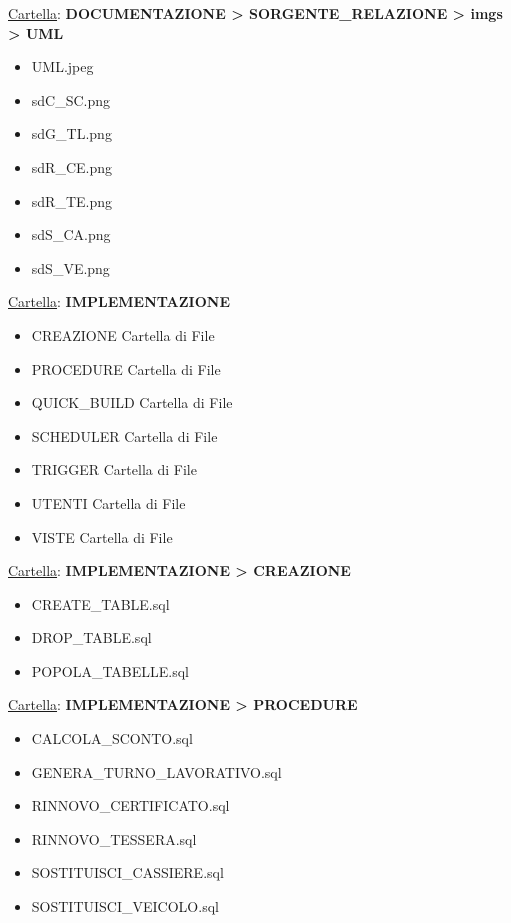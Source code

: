 \documentclass[12pt]{report}
\begin{document}
\underline{Cartella}: \textbf{DOCUMENTAZIONE > SORGENTE\_RELAZIONE > imgs > UML}
\begin{itemize}
\item UML.jpeg
\item sdC\_SC.png
\item sdG\_TL.png
\item sdR\_CE.png
\item sdR\_TE.png
\item sdS\_CA.png
\item sdS\_VE.png
\end{itemize}

\underline{Cartella}: \textbf{IMPLEMENTAZIONE}
\begin{itemize}
\item CREAZIONE				\hspace{38mm} Cartella di File
\item PROCEDURE				\hspace{36mm} Cartella di File
\item QUICK\_BUILD			\hspace{33mm} Cartella di File
\item SCHEDULER				\hspace{36mm} Cartella di File
\item TRIGGER				\hspace{43mm} Cartella di File
\item UTENTI				\hspace{45mm} Cartella di File
\item VISTE					\hspace{49mm} Cartella di File
\end{itemize}
\underline{Cartella}: \textbf{IMPLEMENTAZIONE > CREAZIONE}
\begin{itemize}
\item CREATE\_TABLE.sql
\item DROP\_TABLE.sql
\item POPOLA\_TABELLE.sql
\end{itemize}
\underline{Cartella}: \textbf{IMPLEMENTAZIONE > PROCEDURE}
\begin{itemize}
\item CALCOLA\_SCONTO.sql
\item GENERA\_TURNO\_LAVORATIVO.sql
\item RINNOVO\_CERTIFICATO.sql
\item RINNOVO\_TESSERA.sql
\item SOSTITUISCI\_CASSIERE.sql
\item SOSTITUISCI\_VEICOLO.sql
\end{itemize}
\end{document}
